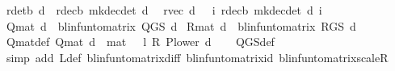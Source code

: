 \begin{isabellebody}
\ {\isachardoublequoteopen}r{\isacharunderscore}{\kern0pt}det\isactrlsub b\ d\ {\isasymequiv}\ r{\isacharunderscore}{\kern0pt}dec\isactrlsub b\ {\isacharparenleft}{\kern0pt}mk{\isacharunderscore}{\kern0pt}dec{\isacharunderscore}{\kern0pt}det\ d{\isacharparenright}{\kern0pt}\ {\isachardoublequoteclose}\isanewline
{}\isamarkupfalse%
\ {\isachardoublequoteopen}r{\isacharunderscore}{\kern0pt}vec\ d\ {\isasymequiv}\ {\isasymchi}\ i{\isachardot}{\kern0pt}\ r{\isacharunderscore}{\kern0pt}dec\isactrlsub b\ {\isacharparenleft}{\kern0pt}mk{\isacharunderscore}{\kern0pt}dec{\isacharunderscore}{\kern0pt}det\ d{\isacharparenright}{\kern0pt}\ i{\isachardoublequoteclose}\isanewline
\isanewline
{}\isamarkupfalse%
\ {\isachardoublequoteopen}Q{\isacharunderscore}{\kern0pt}mat\ d\ {\isasymequiv}\ blinfun{\isacharunderscore}{\kern0pt}to{\isacharunderscore}{\kern0pt}matrix\ {\isacharparenleft}{\kern0pt}Q{\isacharunderscore}{\kern0pt}GS\ d{\isacharparenright}{\kern0pt}{\isachardoublequoteclose}\isanewline
{}\isamarkupfalse%
\ {\isachardoublequoteopen}R{\isacharunderscore}{\kern0pt}mat\ d\ {\isasymequiv}\ blinfun{\isacharunderscore}{\kern0pt}to{\isacharunderscore}{\kern0pt}matrix\ {\isacharparenleft}{\kern0pt}R{\isacharunderscore}{\kern0pt}GS\ d{\isacharparenright}{\kern0pt}{\isachardoublequoteclose}\isanewline
\isanewline
{}\isamarkupfalse%
\ Q{\isacharunderscore}{\kern0pt}mat{\isacharunderscore}{\kern0pt}def{\isacharcolon}{\kern0pt}\ {\isachardoublequoteopen}Q{\isacharunderscore}{\kern0pt}mat\ d\ {\isacharequal}{\kern0pt}\ mat\ {}\ {\isacharminus}{\kern0pt}\ l\ {\isacharasterisk}{\kern0pt}\isactrlsub R\ P{\isacharunderscore}{\kern0pt}lower\ d{\isachardoublequoteclose}\isanewline
%
\isadelimproof
\ \ %
\endisadelimproof
%
\isatagproof
{}\isamarkupfalse%
\ Q{\isacharunderscore}{\kern0pt}GS{\isacharunderscore}{\kern0pt}def\isanewline
\ \ \isamarkupfalse%
\ {\isacharparenleft}{\kern0pt}simp\ add{\isacharcolon}{\kern0pt}\ {\isasymP}\isactrlsub L{\isacharunderscore}{\kern0pt}def\ blinfun{\isacharunderscore}{\kern0pt}to{\isacharunderscore}{\kern0pt}matrix{\isacharunderscore}{\kern0pt}diff\ blinfun{\isacharunderscore}{\kern0pt}to{\isacharunderscore}{\kern0pt}matrix{\isacharunderscore}{\kern0pt}id\ blinfun{\isacharunderscore}{\kern0pt}to{\isacharunderscore}{\kern0pt}matrix{\isacharunderscore}{\kern0pt}scaleR{\isacharparenright}{\kern0pt}%
\endisatagproof
{\isafoldproof}%
%
\isadelimproof
\isanewline
%
\endisadelimproof
\isanewline
{}\isamarkupfalse%

\end{isabellebody}
